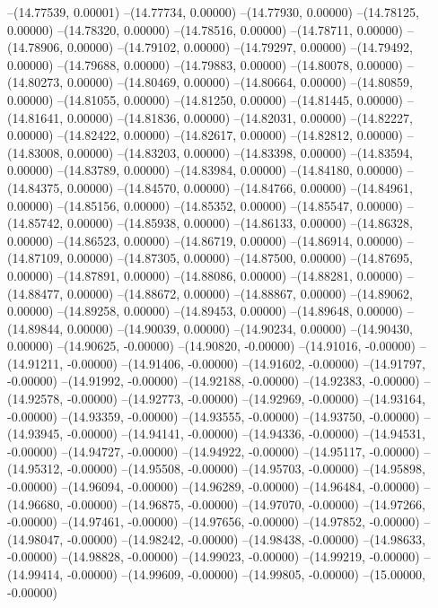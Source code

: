 --(14.77539, 0.00001)
--(14.77734, 0.00000)
--(14.77930, 0.00000)
--(14.78125, 0.00000)
--(14.78320, 0.00000)
--(14.78516, 0.00000)
--(14.78711, 0.00000)
--(14.78906, 0.00000)
--(14.79102, 0.00000)
--(14.79297, 0.00000)
--(14.79492, 0.00000)
--(14.79688, 0.00000)
--(14.79883, 0.00000)
--(14.80078, 0.00000)
--(14.80273, 0.00000)
--(14.80469, 0.00000)
--(14.80664, 0.00000)
--(14.80859, 0.00000)
--(14.81055, 0.00000)
--(14.81250, 0.00000)
--(14.81445, 0.00000)
--(14.81641, 0.00000)
--(14.81836, 0.00000)
--(14.82031, 0.00000)
--(14.82227, 0.00000)
--(14.82422, 0.00000)
--(14.82617, 0.00000)
--(14.82812, 0.00000)
--(14.83008, 0.00000)
--(14.83203, 0.00000)
--(14.83398, 0.00000)
--(14.83594, 0.00000)
--(14.83789, 0.00000)
--(14.83984, 0.00000)
--(14.84180, 0.00000)
--(14.84375, 0.00000)
--(14.84570, 0.00000)
--(14.84766, 0.00000)
--(14.84961, 0.00000)
--(14.85156, 0.00000)
--(14.85352, 0.00000)
--(14.85547, 0.00000)
--(14.85742, 0.00000)
--(14.85938, 0.00000)
--(14.86133, 0.00000)
--(14.86328, 0.00000)
--(14.86523, 0.00000)
--(14.86719, 0.00000)
--(14.86914, 0.00000)
--(14.87109, 0.00000)
--(14.87305, 0.00000)
--(14.87500, 0.00000)
--(14.87695, 0.00000)
--(14.87891, 0.00000)
--(14.88086, 0.00000)
--(14.88281, 0.00000)
--(14.88477, 0.00000)
--(14.88672, 0.00000)
--(14.88867, 0.00000)
--(14.89062, 0.00000)
--(14.89258, 0.00000)
--(14.89453, 0.00000)
--(14.89648, 0.00000)
--(14.89844, 0.00000)
--(14.90039, 0.00000)
--(14.90234, 0.00000)
--(14.90430, 0.00000)
--(14.90625, -0.00000)
--(14.90820, -0.00000)
--(14.91016, -0.00000)
--(14.91211, -0.00000)
--(14.91406, -0.00000)
--(14.91602, -0.00000)
--(14.91797, -0.00000)
--(14.91992, -0.00000)
--(14.92188, -0.00000)
--(14.92383, -0.00000)
--(14.92578, -0.00000)
--(14.92773, -0.00000)
--(14.92969, -0.00000)
--(14.93164, -0.00000)
--(14.93359, -0.00000)
--(14.93555, -0.00000)
--(14.93750, -0.00000)
--(14.93945, -0.00000)
--(14.94141, -0.00000)
--(14.94336, -0.00000)
--(14.94531, -0.00000)
--(14.94727, -0.00000)
--(14.94922, -0.00000)
--(14.95117, -0.00000)
--(14.95312, -0.00000)
--(14.95508, -0.00000)
--(14.95703, -0.00000)
--(14.95898, -0.00000)
--(14.96094, -0.00000)
--(14.96289, -0.00000)
--(14.96484, -0.00000)
--(14.96680, -0.00000)
--(14.96875, -0.00000)
--(14.97070, -0.00000)
--(14.97266, -0.00000)
--(14.97461, -0.00000)
--(14.97656, -0.00000)
--(14.97852, -0.00000)
--(14.98047, -0.00000)
--(14.98242, -0.00000)
--(14.98438, -0.00000)
--(14.98633, -0.00000)
--(14.98828, -0.00000)
--(14.99023, -0.00000)
--(14.99219, -0.00000)
--(14.99414, -0.00000)
--(14.99609, -0.00000)
--(14.99805, -0.00000)
--(15.00000, -0.00000)
